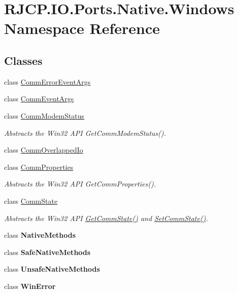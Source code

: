 \hypertarget{namespace_r_j_c_p_1_1_i_o_1_1_ports_1_1_native_1_1_windows}{}\section{R\+J\+C\+P.\+I\+O.\+Ports.\+Native.\+Windows Namespace Reference}
\label{namespace_r_j_c_p_1_1_i_o_1_1_ports_1_1_native_1_1_windows}
\subsection*{Classes}
\begin{DoxyCompactItemize}
\item 
class \mbox{\hyperlink{class_r_j_c_p_1_1_i_o_1_1_ports_1_1_native_1_1_windows_1_1_comm_error_event_args}{Comm\+Error\+Event\+Args}}
\item 
class \mbox{\hyperlink{class_r_j_c_p_1_1_i_o_1_1_ports_1_1_native_1_1_windows_1_1_comm_event_args}{Comm\+Event\+Args}}
\item 
class \mbox{\hyperlink{class_r_j_c_p_1_1_i_o_1_1_ports_1_1_native_1_1_windows_1_1_comm_modem_status}{Comm\+Modem\+Status}}
\begin{DoxyCompactList}\small\item\em Abstracts the Win32 A\+PI Get\+Comm\+Modem\+Status(). \end{DoxyCompactList}\item 
class \mbox{\hyperlink{class_r_j_c_p_1_1_i_o_1_1_ports_1_1_native_1_1_windows_1_1_comm_overlapped_io}{Comm\+Overlapped\+Io}}
\item 
class \mbox{\hyperlink{class_r_j_c_p_1_1_i_o_1_1_ports_1_1_native_1_1_windows_1_1_comm_properties}{Comm\+Properties}}
\begin{DoxyCompactList}\small\item\em Abstracts the Win32 A\+PI Get\+Comm\+Properties(). \end{DoxyCompactList}\item 
class \mbox{\hyperlink{class_r_j_c_p_1_1_i_o_1_1_ports_1_1_native_1_1_windows_1_1_comm_state}{Comm\+State}}
\begin{DoxyCompactList}\small\item\em Abstracts the Win32 A\+PI \mbox{\hyperlink{class_r_j_c_p_1_1_i_o_1_1_ports_1_1_native_1_1_windows_1_1_comm_state_a49fb7ac8787598bf4f135c6a867ec59e}{Get\+Comm\+State()}} and \mbox{\hyperlink{class_r_j_c_p_1_1_i_o_1_1_ports_1_1_native_1_1_windows_1_1_comm_state_a0a20f9d712c5ad860155845b1dffd56b}{Set\+Comm\+State()}}. \end{DoxyCompactList}\item 
class {\bfseries Native\+Methods}
\item 
class {\bfseries Safe\+Native\+Methods}
\item 
class {\bfseries Unsafe\+Native\+Methods}
\item 
class {\bfseries Win\+Error}
\end{DoxyCompactItemize}

